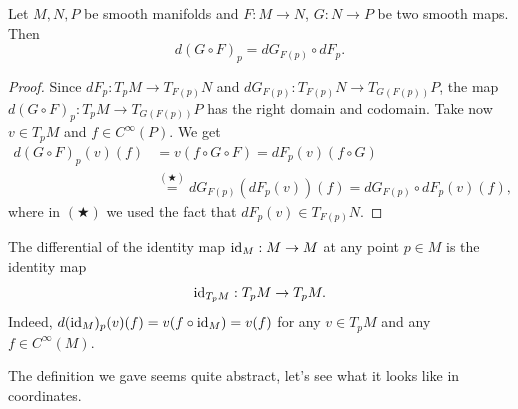 \begin{theorem}\label{thm:chainrule_mfld}
  Let $M, N, P$ be smooth manifolds and $F: M \to N$, $G: N\to P$ be two smooth maps. Then
  \begin{equation}
    d(G\circ F)_p = dG_{F(p)} \circ dF_p.
  \end{equation}
\end{theorem}
\begin{proof}
  Since $dF_p : T_p M \to T_{F(p)}N$ and $dG_{F(p)}: T_{F(p)}N \to T_{G(F(p))}P$, the map $d(G\circ F)_p: T_p M \to T_{G(F(p))}P$ has the right domain and codomain.
  Take now $v\in T_p M$ and $f\in C^\infty(P)$. We get
  \begin{align}
    d(G\circ F)_p(v)(f) & = v(f\circ G \circ F)
    = dF_p (v)(f\circ G)                                                  \\
                        & \stackrel{(\bigstar)}{=} dG_{F(p)}(dF_p (v))(f)
    = dG_{F(p)} \circ dF_p (v)(f),
  \end{align}
  where in $(\bigstar)$ we used the fact that $dF_p (v)\in T_{F(p)}N$.
\end{proof}

\begin{remark}
  The differential of the identity map $\operatorname{id}_M:M\to M$ at any point $p\in M$ is the identity map
  \begin{equation}
    \operatorname{id}_{T_pM}: T_pM \to T_pM.
  \end{equation}
  Indeed, $d (\operatorname{id}_M)_p(v)(f) = v(f\circ\operatorname{id}_M) = v(f)$ for any $v\in T_pM$ and any $f\in C^\infty(M)$.
\end{remark}

The definition we gave seems quite abstract, let's see what it looks like in coordinates.

